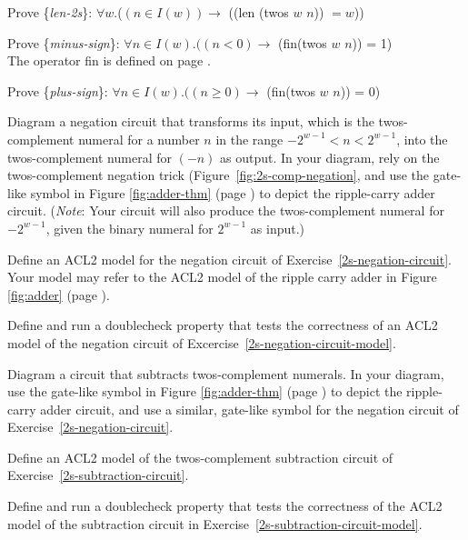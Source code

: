 \begin{ExerciseList}

\Exercise \label{len-2s}
Prove \{\emph{len-2s}\}:
$\forall w$.($(n \in I(w)) \rightarrow$ ((len (twos $w$ $n$)) $= w$))

\Exercise \label{minus-sign}
Prove \{\emph{minus-sign}\}:
$\forall n \in I(w).((n < 0) \rightarrow$ (fin(twos $w$ $n$)) = 1) \\
The operator fin is defined on page \pageref{fin-defun}.

\Exercise \label{plus-sign} Prove \{\emph{plus-sign}\}:
$\forall n \in I(w).((n \ge 0) \rightarrow$ (fin(twos $w$ $n$)) = $0$)

\Exercise \label{2s-negation-circuit}
Diagram a negation circuit that transforms its input,
which is the twos-complement numeral for a number $n$ in the range
$-2^{w-1} < n < 2^{w-1}$,
into the twos-complement numeral for $(-n)$ as output.
In your diagram, rely on the twos-complement negation trick
(Figure~\ref{fig:2s-comp-negation},
and use the gate-like symbol in
Figure \ref{fig:adder-thm} (page \pageref{fig:adder-thm})
to depict the ripple-carry adder circuit.
(\emph{Note}: Your circuit will also produce the twos-complement
numeral for $-2^{w-1}$, given the binary numeral for $2^{w-1}$
as input.)

\Exercise \label{2s-negation-circuit-model}
Define an ACL2 model for the negation circuit
of Exercise~\ref{2s-negation-circuit}.
Your model may refer to the ACL2 model
of the ripple carry adder in
Figure \ref{fig:adder} (page \pageref{fig:adder}).

\Exercise Define and run a doublecheck property that
tests the correctness of
an ACL2 model of the negation circuit of
Excercise~\ref{2s-negation-circuit-model}.

\Exercise \label{2s-subtraction-circuit}
Diagram a circuit that subtracts twos-complement numerals.
In your diagram, use the gate-like symbol in
Figure \ref{fig:adder-thm} (page \pageref{fig:adder-thm})
to depict the ripple-carry adder circuit,
and use a similar, gate-like symbol for the negation circuit
of Exercise~\ref{2s-negation-circuit}.

\Exercise \label{2s-subtraction-circuit-model}
Define an ACL2 model of the twos-complement
subtraction circuit of Exercise~\ref{2s-subtraction-circuit}.

\Exercise Define and run a doublecheck property that
tests the correctness of
the ACL2 model of the subtraction circuit
in Exercise~\ref{2s-subtraction-circuit-model}.


\end{ExerciseList}

